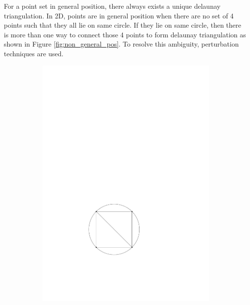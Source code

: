 For a point set in general position, there always exists a unique delaunay triangulation. In 2D, points are in general position when there are no set of 4 points such that they all lie on same circle. If they lie on same circle, then there is more than one way to connect those 4 points to form delaunay triangulation as shown in Figure \ref{fig:non_general_pos}. To resolve this ambiguity, perturbation techniques are used.

\begin{figure}[h]
    \centering
    \begin{subfigure}[t]{0.5\textwidth}
        \centering
        \includegraphics{images/non_general_pos_a.pdf}
    \end{subfigure}%
    \begin{subfigure}[t]{0.5\textwidth}
        \centering

\end{subfigure}
\end{figure}
